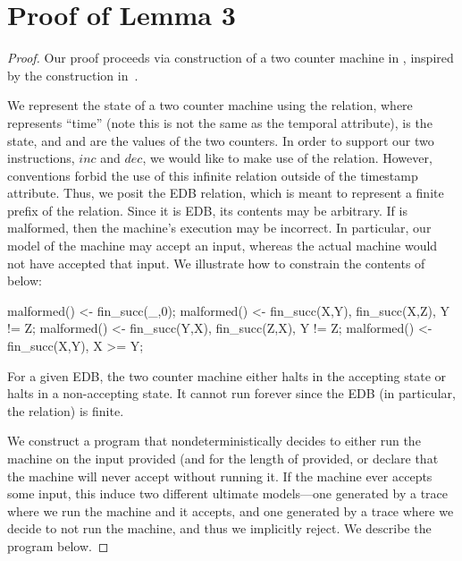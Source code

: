\section{Proof of Lemma 3}
\begin{proof}
Our proof proceeds via construction of a two counter machine in \lang, inspired by the construction in~\cite{undecidable-datalog}.

We represent the state of a two counter machine using the \linebreak {} relation, where  represents ``time'' (note this is not the same as the \lang temporal attribute),  is the state, and  and  are the values of the two counters.  In order to support our two instructions, $inc$ and $dec$, we would like to make use of the  relation.  However, \lang conventions forbid the use of this infinite relation outside of the timestamp attribute.  Thus, we posit the  EDB relation, which is meant to represent a finite prefix of the  relation.  Since it is EDB, its contents may be arbitrary.  If  is malformed, then the machine's execution may be incorrect.  In particular, our model of the machine may accept an input, whereas the actual machine would not have accepted that input.  We illustrate how to constrain the contents of  below:

\begin{Dedalus}
malformed() <- fin_succ(_,0);
malformed() <- fin_succ(X,Y), fin_succ(X,Z), Y != Z;
malformed() <- fin_succ(Y,X), fin_succ(Z,X), Y != Z;
malformed() <- fin_succ(X,Y), X >= Y;
\end{Dedalus}

For a given EDB, the two counter machine either halts in the accepting state or halts in a non-accepting state.  It cannot run forever since the EDB (in particular, the  relation) is finite.

We construct a \lang program that nondeterministically decides to either run the machine on the input provided (and for the length of  provided, or declare that the machine will never accept without running it.  If the machine ever accepts some input, this induce two different ultimate models---one generated by a trace where we run the machine and it accepts, and one generated by a trace where we decide to not run the machine, and thus we implicitly reject.  We describe the program below. 


\end{proof}
